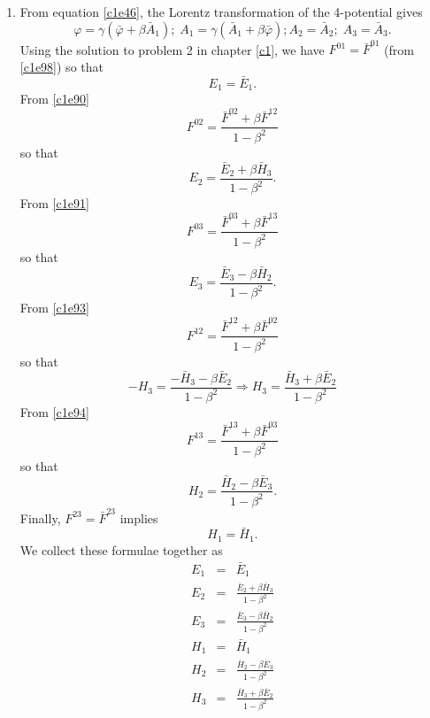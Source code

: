 \begin{enumerate}
\item From equation \eqref{c1e46}, the Lorentz transformation of the 4-potential
gives
\begin{equation}\label{c3e80}
\varphi = \gamma(\bar{\varphi} + \beta\bar{A}_1);
\; A_1 = \gamma(\bar{A}_1 + \beta\bar{\varphi}); A_2 = \bar{A}_2;\; A_3 = \bar{A}_3.
\end{equation}
Using the solution to problem 2 in chapter \ref{c1}, we have $F^{01} = 
\bar{F}^{01}$ (from \eqref{c1e98}) so that 
\begin{equation*}
E_1 = \bar{E}_1.
\end{equation*}
From \eqref{c1e90}
\[
F^{02} = \frac{\bar{F}^{02} + \beta\bar{F}^{12}}{1 - \beta^2}
\]
so that
\begin{equation*}
E_2 = \frac{\bar{E}_2 + \beta\bar{H}_3}{1 - \beta^2}.
\end{equation*}
From \eqref{c1e91}
\[
F^{03} = \frac{\bar{F}^{03} + \beta\bar{F}^{13}}{1 - \beta^2}
\]
so that
\begin{equation*}
E_3 = \frac{\bar{E}_3 - \beta\bar{H}_2}{1 - \beta^2}.
\end{equation*}
From \eqref{c1e93}
\[
F^{12} = \frac{\bar{F}^{12} + \beta\bar{F}^{02}}{1 - \beta^2}
\]
so that
\begin{equation*}
-H_3 = \frac{-\bar{H}_3 - \beta\bar{E}_2}{1 - \beta^2} \Rightarrow 
H_3 = \frac{\bar{H}_3 + \beta\bar{E}_2}{1 - \beta^2}
\end{equation*}
From \eqref{c1e94}
\[
F^{13} = \frac{\bar{F}^{13} + \beta\bar{F}^{03}}{1 - \beta^2}
\]
so that
\begin{equation*}
H_2 = \frac{\bar{H}_2 - \beta\bar{E}_3}{1 - \beta^2}.
\end{equation*}
Finally, $F^{23} = \bar{F}^{23}$ implies
\begin{equation*}
H_1 = \bar{H}_1.
\end{equation*}
We collect these formulae together as
\begin{eqnarray}
E_1 &=& \bar{E}_1 \\ \label{c3e81}
E_2 &=& \frac{\bar{E}_2 + \beta\bar{H}_3}{1 - \beta^2} \\ \label{c3e82}
E_3 &=& \frac{\bar{E}_3 - \beta\bar{H}_2}{1 - \beta^2} \\ \label{c3e83}
H_1 &=& \bar{H}_1 \\ \label{c3e84}
H_2 &=& \frac{\bar{H}_2 - \beta\bar{E}_3}{1 - \beta^2} \\ \label{c3e85}
H_3 &=& \frac{\bar{H}_3 + \beta\bar{E}_2}{1 - \beta^2} \label{c3e86}
\end{eqnarray}


\end{enumerate}
